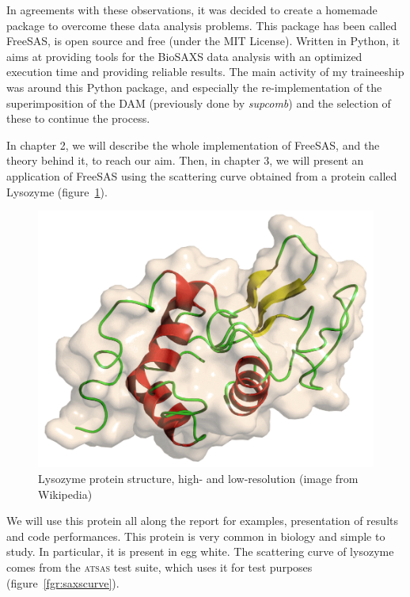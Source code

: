 \documentclass[a4paper, 11pt]{report}
\begin{document}
In agreements with these observations, it was decided to create a 
homemade package to overcome these data analysis problems. 
This package has been called FreeSAS, is open source and free (under 
the MIT License). 
Written in Python, it aims at providing tools for the BioSAXS data 
analysis with an optimized execution time and providing reliable 
results. 
The main activity of my traineeship was around this Python package, 
and especially the re-implementation of the superimposition of the DAM 
(previously done by \textit{supcomb}) and the selection of these to 
continue the process.

In chapter 2, we will describe the whole implementation of FreeSAS, 
and the theory behind it, to reach our aim. 
Then, in chapter 3, we will present an application of FreeSAS using the 
scattering curve obtained from a protein called Lysozyme 
(figure~\ref{fgr:lysozyme}). 
\begin{figure}
\centering
\includegraphics[scale=0.2]{lysozyme_wiki.png}
\caption{Lysozyme protein structure, high- and low-resolution (image 
  from Wikipedia)}
\label{fgr:lysozyme}
\end{figure}

We will use this protein all along the report for examples, 
presentation of results and code performances. 
This protein is very common in biology and simple to study. 
In particular, it is present in egg white. 
The scattering curve of lysozyme comes from the \textsc{atsas} test 
suite, which uses it for test purposes (figure~\ref{fgr:saxscurve}).
\end{document}
